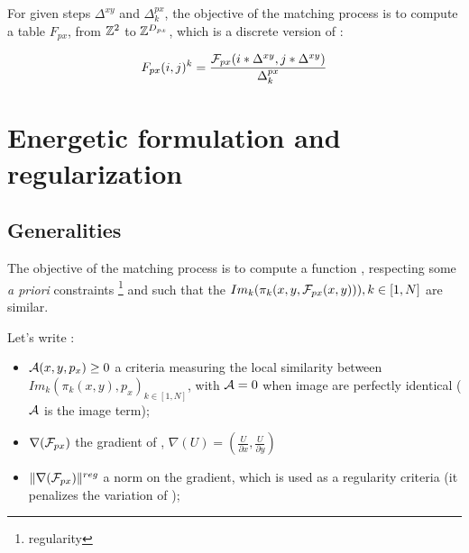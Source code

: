 For given steps $\Delta^{xy}$ and $\Delta^{px}_k$, the objective of
the matching process is to compute a table $F_{px}$, from $\mathbb{Z}^2$  to
$\mathbb{Z}^{D_{px}}$, which is a discrete version of \FPx:


\begin{equation}
   F_{px}(i,j)^k = \frac{{\mathcal F}_{px}(i*\Delta^{xy},j*\Delta^{xy})}{\Delta^{px}_k}
\end{equation}





\section{Energetic formulation and regularization}

\subsection{Generalities}

\label{AM:Appr:Energ}


The objective of the matching process is to compute a function
\FPx , respecting some \emph{a priori} constraints \footnote{regularity}
and such that the $Im_k(\pi_k(x,y,{\mathcal F}_{px}(x,y))),k\in [1,N]$ are similar.



Let's write :

\begin{itemize}
     \item ${\mathcal A}(x,y,p_x) \geq 0$  a criteria measuring the
            local similarity between
            $Im_k(\pi_k(x,y),p_x)_{k\in [1,N]}$, with ${\mathcal A}=0$
            when image are perfectly identical (${\mathcal A}$ is the image term);

      \item $\nabla({\mathcal F}_{px})$ the gradient of \FPx,
             $\nabla(U) = (\frac{U}{\partial x}, \frac{U}{\partial y})$

      \item $\| \nabla({\mathcal F}_{px}) \|^{reg}$ a norm on the gradient, which is used as
            a regularity criteria (it penalizes the variation of \FPx);
\end{itemize}


